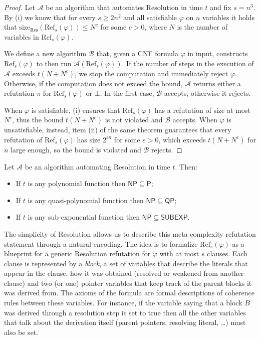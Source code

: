 \begin{proof}
    Let $\mathcal{A}$ be an algorithm that automates Resolution in time $t$ and fix $s = n^3$. By (i) we know that for every $s \geq 2n^2$ and all satisfiable $\varphi$ on $n$ variables it holds that $\mathrm{size}_{\mathrm{Res}}(\mathrm{Ref}_s(\varphi)) \leq N^c$ for some $c > 0$, where $N$ is the number of variables in $\mathrm{Ref}_s(\varphi)$.
    
    We define a new algorithm $\mathcal{B}$ that, given a CNF formula $\varphi$ in input, constructs $\mathrm{Ref}_{s}(\varphi)$ to then run $\mathcal{A}(\mathrm{Ref}_{s}(\varphi))$. If the number of steps in the execution of $\mathcal{A}$ exceeds $t(N+N^c)$, we stop the computation and immediately reject $\varphi$. Otherwise, if the computation does not exceed the bound, $\mathcal{A}$ returns either a refutation $\pi$ for $\mathrm{Ref}_s(\varphi)$ or $\bot$. In the first case, $\mathcal{B}$ accepts, otherwise it rejects.

    When $\varphi$ is satisfiable, (i) ensures that $\mathrm{Ref}_s(\varphi)$ has a refutation of size at most $N^c$, thus the bound $t(N+N^c)$ is not violated and $\mathcal{B}$ accepts. When $\varphi$ is unsatisfiable, instead, item (ii) of the same theorem guarantees that every refutation of $\mathrm{Ref}_s(\varphi)$ has size $2^{\varepsilon n}$ for some $\varepsilon > 0$, which exceeds $t(N + N^c)$ for $n$ large enough, so the bound is violated and $\mathcal{B}$ rejects.
\end{proof}

\begin{corollary}
    Let $\mathcal{A}$ be an algorithm automating Resolution in time $t$. Then:
    \begin{itemize}[nosep]
        \item If $t$ is any polynomial function then $\mathsf{NP} \subseteq \mathsf{P}$;
        \item If $t$ is any quasi-polynomial function then $\mathsf{NP} \subseteq \mathsf{QP}$;
        \item If $t$ is any sub-exponential function then $\mathsf{NP} \subseteq \mathsf{SUBEXP}$.
    \end{itemize}
\end{corollary}

The simplicity of Resolution allows us to describe this meta-complexity refutation statement through a natural encoding. The idea is to formalize $\mathrm{Ref}_s(\varphi)$ as a blueprint for a generic Resolution refutation for $\varphi$ with at most $s$ clauses. Each clause is represented by a \textit{block}, a set of variables that describe the literals that appear in the clause, how it was obtained (resolved or weakened from another clause) and two (or one) pointer variables that keep track of the parent blocks it was derived from. The axioms of the formula are formal descriptions of coherence rules between these variables. For instance, if the variable saying that a block $B$ was derived through a resolution step is set to true then all the other variables that talk about the derivation itself (parent pointers, resolving literal, \dots) must also be set.

